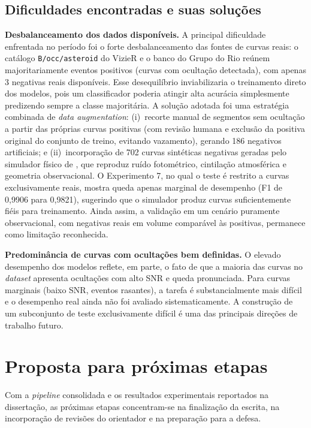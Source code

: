 \documentclass[12pt]{article}
\numberwithin{equation}{section}
\begin{document}
\subsection{Dificuldades encontradas e suas soluções}

\textbf{Desbalanceamento dos dados disponíveis.} A principal dificuldade enfrentada no período foi o forte desbalanceamento das fontes de curvas reais: o catálogo \texttt{B/occ/asteroid} do VizieR e o banco do Grupo do Rio reúnem majoritariamente eventos positivos (curvas com ocultação detectada), com apenas 3 negativas reais disponíveis. Esse desequilíbrio inviabilizaria o treinamento direto dos modelos, pois um classificador poderia atingir alta acurácia simplesmente predizendo sempre a classe majoritária. A solução adotada foi uma estratégia combinada de \textit{data augmentation}: (i)~recorte manual de segmentos sem ocultação a partir das próprias curvas positivas (com revisão humana e exclusão da positiva original do conjunto de treino, evitando vazamento), gerando 186 negativos artificiais; e (ii)~incorporação de 702 curvas sintéticas negativas geradas pelo simulador físico de \cite{Simulator}, que reproduz ruído fotométrico, cintilação atmosférica e geometria observacional. O Experimento 7, no qual o teste é restrito a curvas exclusivamente reais, mostra queda apenas marginal de desempenho (F1 de 0,9906 para 0,9821), sugerindo que o simulador produz curvas suficientemente fiéis para treinamento. Ainda assim, a validação em um cenário puramente observacional, com negativas reais em volume comparável às positivas, permanece como limitação reconhecida.

\textbf{Predominância de curvas com ocultações bem definidas.} O elevado desempenho dos modelos reflete, em parte, o fato de que a maioria das curvas no \textit{dataset} apresenta ocultações com alto SNR e queda pronunciada. Para curvas marginais (baixo SNR, eventos rasantes), a tarefa é substancialmente mais difícil e o desempenho real ainda não foi avaliado sistematicamente. A construção de um subconjunto de teste exclusivamente difícil é uma das principais direções de trabalho futuro.


\section{\sc Proposta para próximas etapas}

Com a \textit{pipeline} consolidada e os resultados experimentais reportados na dissertação, as próximas etapas concentram-se na finalização da escrita, na incorporação de revisões do orientador e na preparação para a defesa.
\end{document}
